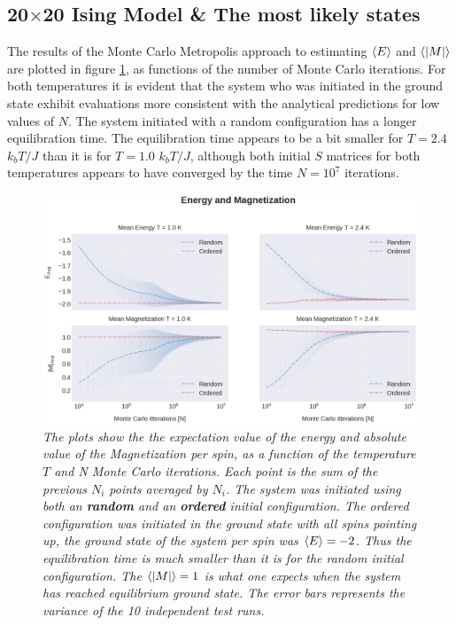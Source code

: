 \documentclass[%
reprint,nofootinbib,
amsmath,amssymb,
aps,
]{revtex4-1}
\begin{document}
\subsection*{20$\times$20 Ising Model \& The most likely states} \noindent 
The results of the Monte Carlo Metropolis approach to estimating $\expval{E}$ and $\expval{\abs{M}}$ are plotted in figure \ref{4C11}, as functions of the number of Monte Carlo iterations. For both temperatures it is evident that the system who was initiated in the ground state exhibit evaluations more consistent with the analytical predictions for low values of $N$. The system initiated with a random configuration has a longer equilibration time. The equilibration time appears to be a bit smaller for $T = 2.4$ $k_bT/J$ than it is for $T = 1.0$ $k_bT/J$, although both initial $S$ matrices for both temperatures appears to have converged by the time $N = 10^7$ iterations.  \\

\onecolumngrid

\vspace{2.3cm}
\begin{figure}[H] 
	\includegraphics[width = \textwidth]{Figures/4C1.png} 
	\caption{\label{4C11} \textit {The plots show the the expectation value of the energy and absolute value of the Magnetization per spin, as a function of the temperature $T$ and N Monte Carlo iterations. Each point is the sum of the previous $N_i$ points averaged by $N_i$. The system was initiated using both an \textbf{random} and an \textbf{ordered} initial configuration. The ordered configuration was initiated in the ground state with all spins pointing up, the ground state of the system per spin was $\expval{E} = -2$. Thus the equilibration time is much smaller than it is for the random initial configuration. The $\expval{\abs{M}} = 1$ is what one expects when the system has reached equilibrium ground state. The error bars represents the variance of the 10 independent test runs. }}
\end{figure}
\newpage
\vspace{20mm}
\twocolumngrid
\end{document}
